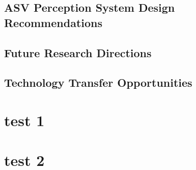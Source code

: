 \documentclass{erauthesis}
\begin{document}

\section{ASV Perception System Design Recommendations}

\section{Future Research Directions}

\section{Technology Transfer Opportunities}




% 


\backmatter

\chapter{test 1}
\chapter{test 2}


\end{document}
